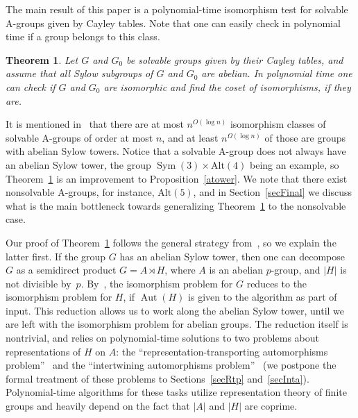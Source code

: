 \documentclass{article}
\newtheorem{theorem}{Theorem}[section]
\DeclareMathOperator{\Sym}{Sym}
\DeclareMathOperator{\Aut}{Aut}
\begin{document}
The main result of this paper is a polynomial-time isomorphism test for solvable A-groups given by Cayley tables.
Note that one can easily check in polynomial time if a group belongs to this class.

\begin{theorem}\label{main}
	Let \( G \) and \( G_0 \) be solvable groups given by their Cayley tables, and assume that all Sylow subgroups of \( G \) and \( G_0 \) are abelian.
	In polynomial time one can check if \( G \) and \( G_0 \) are isomorphic and find the coset of isomorphisms, if they are.
\end{theorem}

It is mentioned in~\cite[Subsection~1.1]{absyl} that there are at most \( n^{O(\log n)} \) isomorphism classes of solvable A-groups of order at most \( n \),
and at least \( n^{\Omega(\log n)} \) of those are groups with abelian Sylow towers. Notice that a solvable A-group does not always have
an abelian Sylow tower, the group \( \Sym(3) \times \mathrm{Alt}(4) \) being an example,
so Theorem~\ref{main} is an improvement to Proposition~\ref{atower}.
We note that there exist nonsolvable A-groups, for instance, \( \mathrm{Alt}(5) \), and in Section~\ref{secFinal}
we discuss what is the main bottleneck towards generalizing Theorem~\ref{main} to the nonsolvable case.

Our proof of Theorem~\ref{main} follows the general strategy from~\cite{absyl}, so we explain the latter first.
If the group \( G \) has an abelian Sylow tower, then one can decompose \( G \) as a semidirect product \( G = A \rtimes H \),
where \( A \) is an abelian \( p \)-group, and \( |H| \) is not divisible by~\( p \). By~\cite[Theorem~1.2]{absyl},
the isomorphism problem for \( G \) reduces to the isomorphism problem for \( H \), if \( \Aut(H) \) is given to the algorithm as part of input.
This reduction allows us to work along the abelian Sylow tower, until we are left with the isomorphism problem for abelian groups.
The reduction itself is nontrivial, and relies on polynomial-time solutions to two problems about representations of \( H \) on \( A \):
the ``representation-transporting automorphisms problem''~\cite[Problem~2]{absyl} and the ``intertwining automorphisms problem''~\cite[Problem~3]{absyl}
(we postpone the formal treatment of these problems to Sections~\ref{secRtp} and~\ref{secInta}).
Polynomial-time algorithms for these tasks utilize representation theory of finite groups and heavily depend on the fact that \( |A| \) and \( |H| \) are coprime.
\end{document}
